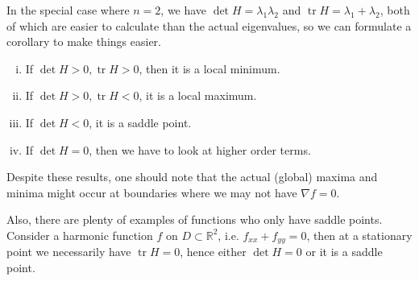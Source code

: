 \documentclass{article}
\begin{document}
In the special case where $n=2$, we have $\det H=\lambda_1\lambda_2$ and $\operatorname{tr} H=\lambda_1+\lambda_2$, both of which are easier to calculate than the actual eigenvalues, so we can formulate a corollary to make things easier.
\begin{corollary}
    \begin{enumerate}[(i)]
        \item If $\det H>0,\operatorname{tr}H>0$, then it is a local minimum.
        \item If $\det H>0,\operatorname{tr}H<0$, it is a local maximum.
        \item If $\det H<0$, it is a saddle point.
        \item If $ \det H=0 $, then we have to look at higher order terms.
    \end{enumerate}
\end{corollary}
Despite these results, one should note that the actual (global) maxima and minima might occur at boundaries where we may not have $\nabla f=0$.

Also, there are plenty of examples of functions who only have saddle points.
Consider a harmonic function $f$ on $D\subset\mathbb R^2$, i.e. $f_{xx}+f_{yy}=0$, then at a stationary point we necessarily have $\operatorname{tr}H=0$, hence either $\det H=0$ or it is a saddle point.
\end{document}
